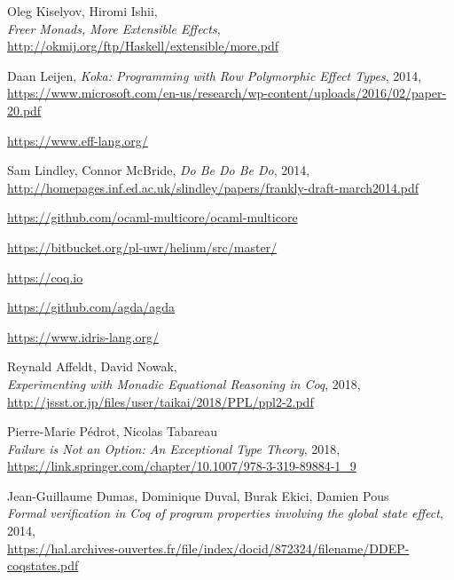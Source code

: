 \documentclass[declaration,inz,english,shortabstract]{iithesis}
\begin{document}
\begin{thebibliography}{1}
        Oleg Kiselyov, Hiromi Ishii, \\
        \textit{Freer Monads, More Extensible Effects}, \\
        \url{http://okmij.org/ftp/Haskell/extensible/more.pdf}

        Daan Leijen,
        \textit{Koka: Programming with Row Polymorphic Effect Types}, 2014, \\
        \url{https://www.microsoft.com/en-us/research/wp-content/uploads/2016/02/paper-20.pdf}

        \url{https://www.eff-lang.org/}

        Sam Lindley, Connor McBride, \textit{Do Be Do Be Do}, 2014, \\
        \url{http://homepages.inf.ed.ac.uk/slindley/papers/frankly-draft-march2014.pdf}

        \url{https://github.com/ocaml-multicore/ocaml-multicore}
        
        \url{https://bitbucket.org/pl-uwr/helium/src/master/}

        \url{https://coq.io}

        \url{https://github.com/agda/agda}

        \url{https://www.idris-lang.org/}

        Reynald Affeldt, David Nowak, \\
        \textit{Experimenting with Monadic Equational Reasoning in Coq}, 2018, \\
        \url{http://jssst.or.jp/files/user/taikai/2018/PPL/ppl2-2.pdf}

        Pierre-Marie Pédrot, Nicolas Tabareau \\
        \textit{Failure is Not an Option: An Exceptional Type Theory}, 2018, \\
        \url{https://link.springer.com/chapter/10.1007/978-3-319-89884-1_9}

        Jean-Guillaume Dumas, Dominique Duval, Burak Ekici, Damien Pous \\
        \textit{Formal verification in Coq of program properties involving the global state effect}, 2014, \\
        \url{https://hal.archives-ouvertes.fr/file/index/docid/872324/filename/DDEP-coqstates.pdf}


\end{thebibliography}
\end{document}
